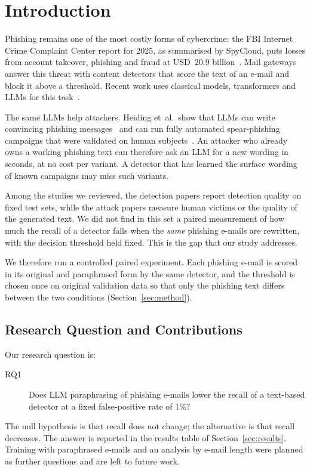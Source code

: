 \section{Introduction}
\label{sec:intro}

Phishing remains one of the most costly forms of cybercrime: the FBI Internet Crime Complaint Center report for 2025, as summarised by SpyCloud, puts losses from account takeover, phishing and fraud at USD~20.9 billion~\cite{thies_fbi_2026}. Mail gateways answer this threat with content detectors that score the text of an e-mail and block it above a threshold. Recent work uses classical models, transformers and LLMs for this task~\cite{koide_chatspamdetector_2024,uddin_explainable_2024,thapa_phishing_2025,kuikel_evaluating_2025,ganiuly_trustworthiness_2025}.

The same LLMs help attackers. Heiding et~al.\ show that LLMs can write convincing phishing messages~\cite{heiding_devising_2023} and can run fully automated spear-phishing campaigns that were validated on human subjects~\cite{heiding_evaluating_2024}. An attacker who already owns a working phishing text can therefore ask an LLM for a new wording in seconds, at no cost per variant. A detector that has learned the surface wording of known campaigns may miss such variants.

Among the studies we reviewed, the detection papers report detection quality on fixed test sets, while the attack papers measure human victims or the quality of the generated text. We did not find in this set a paired measurement of how much the recall of a detector falls when the \emph{same} phishing e-mails are rewritten, with the decision threshold held fixed. This is the gap that our study addresses.

We therefore run a controlled paired experiment. Each phishing e-mail is scored in its original and paraphrased form by the same detector, and the threshold is chosen once on original validation data so that only the phishing text differs between the two conditions (Section~\ref{sec:method}).

\subsection{Research Question and Contributions}
\label{sec:intro:rq}

Our research question is:
\begin{description}
  \item[RQ1] Does LLM paraphrasing of phishing e-mails lower the recall of a text-based detector at a fixed false-positive rate of 1\%?
\end{description}
The null hypothesis is that recall does not change; the alternative is that recall decreases. The answer is reported in the results table of Section~\ref{sec:results}. Training with paraphrased e-mails and an analysis by e-mail length were planned as further questions and are left to future work.

